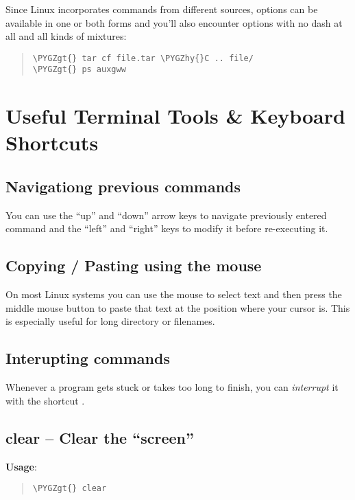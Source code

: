 \documentclass[a4paper,11pt,english]{sphinxmanual}
\def\PYGZgt{\char`\>}
\def\PYGZhy{\char`\-}
\begin{document}
Since Linux incorporates commands from different sources, options can be available in one or both forms and you’ll also encounter options with no dash at all and all kinds of mixtures:
\begin{quote}

\begin{Verbatim}[frame=single, rulecolor=\color{lightgray}, fontfamily=courier, commandchars=\\\{\}]
\PYGZgt{} tar cf file.tar \PYGZhy{}C .. file/
\PYGZgt{} ps auxgww
\end{Verbatim}
\end{quote}


\section{Useful Terminal Tools \& Keyboard Shortcuts}
\label{introduction:useful-terminal-tools-keyboard-shortcuts}

\subsection{Navigationg previous commands}
\label{introduction:navigationg-previous-commands}
You can use the ``up'' and ``down'' arrow keys to navigate previously entered command and the ``left'' and
``right'' keys to modify it before re-executing it.


\subsection{Copying / Pasting using the mouse}
\label{introduction:copying-pasting-using-the-mouse}
On most Linux systems you can use the mouse to select text and then press the middle mouse button to
paste that text at the position where your cursor is. This is especially useful for long directory
or filenames.


\subsection{Interupting commands}
\label{introduction:interupting-commands}
Whenever a program gets stuck or takes too long to finish, you can \emph{interrupt} it with the shortcut
.


\subsection{clear – Clear the “screen”}
\label{introduction:clear-clear-the-screen}
\textbf{Usage}:  
\begin{quote}

\begin{Verbatim}[frame=single, rulecolor=\color{lightgray}, fontfamily=courier, commandchars=\\\{\}]
\PYGZgt{} clear
\end{Verbatim}
\end{quote}
\end{document}
